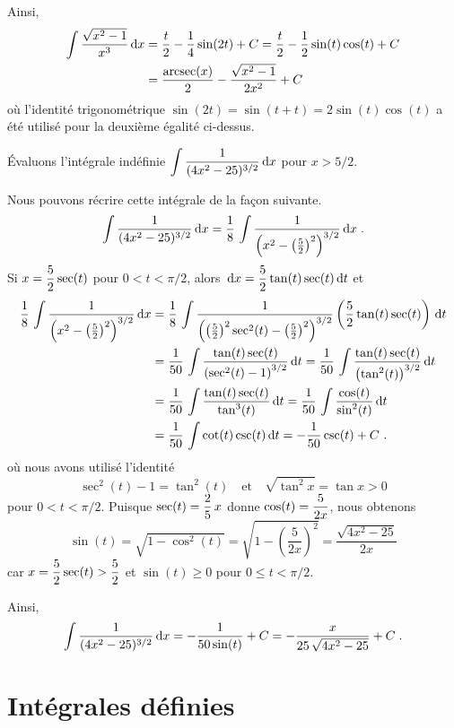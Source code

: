 {\begin{egg}
Ainsi,
\begin{align*}
\int \frac{\sqrt{x^2-1}}{x^3}  \,\mathrm{d}x
&= \frac{t}{2} - \frac{1}{4}\sin(2t) + C
= \frac{t}{2} - \frac{1}{2}\sin(t)\cos(t) + C \\
&= \frac{\operatorname{arcsec}(x)}{2} - \frac{\sqrt{x^2-1}}{2x^2} + C
\end{align*}
où l'identité trigonométrique $\sin(2t) = \sin(t+t) = 2\sin(t)\cos(t)$
a été utilisé pour la deuxième égalité ci-dessus.
\end{egg}

\begin{egg}
Évaluons l'intégrale indéfinie
$\displaystyle \int \frac{1}{(4x^2-25)^{3/2}} \,\mathrm{d}x$
pour $x>5/2$.

Nous pouvons récrire cette intégrale de la façon suivante.
\[
\int \frac{1}{(4x^2-25)^{3/2}} \,\mathrm{d}x
= \frac{1}{8} \, \int \frac{1}
{\left(x^2 - \left(\frac{5}{2}\right)^2\right)^{3/2}} \,\mathrm{d}x\; .
\]
Si $\displaystyle x = \frac{5}{2} \sec(t)$ pour
$0 < t < \pi/2$, alors
$\displaystyle \,\mathrm{d}x = \frac{5}{2} \tan(t)\sec(t) \,\mathrm{d}t$ et
\begin{align*}
\frac{1}{8} \, \int \frac{1}
{\left(x^2 - \left(\frac{5}{2}\right)^2\right)^{3/2}} \,\mathrm{d}x
&= \frac{1}{8} \,\int \frac{1} {\left(\left(\frac{5}{2}\right)^2\sec^2(t) -
\left(\frac{5}{2}\right)^2\right)^{3/2}}
\left( \frac{5}{2} \tan(t)\sec(t)\right) \,\mathrm{d}t \\
&= \frac{1}{50} \, \int
\frac{\tan(t)\sec(t)}{\left(\sec^2(t) - 1\right)^{3/2}} \,\mathrm{d}t
= \frac{1}{50} \, \int
\frac{\tan(t)\sec(t)}{\left(\tan^2(t)\right)^{3/2}} \,\mathrm{d}t \\
&= \frac{1}{50} \, \int \frac{\tan(t)\sec(t)}{\tan^3(t)} \,\mathrm{d}t
= \frac{1}{50} \, \int \frac{\cos(t)}{\sin^2(t)} \,\mathrm{d}t \\
& = \frac{1}{50} \, \int \cot(t) \csc(t) \,\mathrm{d}t
= - \frac{1}{50} \csc(t) + C \ .
\end{align*}
où nous avons utilisé l'identité
\[
\sec^2(t) -1 = \tan^2(t) \quad \text{et} \quad
\sqrt{\tan^2{x}} = \tan{x} > 0
\]
pour $0< t < \pi/2$.  Puisque $\displaystyle \sec(t) = \frac{2}{5}\, x$ donne
$\displaystyle \cos(t) = \frac{5}{2x}$, nous obtenons
\[
\sin(t) = \sqrt{1-\cos^2(t)} = \sqrt{1 -\left(\frac{5}{2x}\right)^2}
= \frac{\sqrt{4x^2-25}}{2x}
\]
car $\displaystyle x = \frac{5}{2}\sec(t) > \frac{5}{2} $ et
$\sin(t) \geq 0$ pour $0\leq t < \pi/2$.

Ainsi,
\[
\int \frac{1}{(4x^2-25)^{3/2}} \,\mathrm{d}x
= - \frac{1}{50\sin(t)} + C = - \frac{x}{25 \, \sqrt{4x^2-25}} + C \; .
\]
\end{egg}

\section{Intégrales définies}

}
